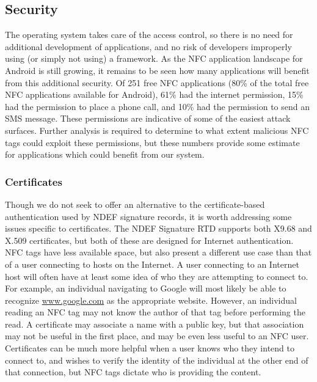 \documentclass[12pt]{article}
\begin{document}
\subsection{Security}
The operating system takes care of the access control, so there is no need for additional development of applications, and no risk of developers improperly using (or simply not using) a framework.
As the NFC application landscape for Android is still growing, it remains to be seen how many applications will benefit from this additional security.
Of 251 free NFC applications (80\% of the total free NFC applications available for Android), 61\% had the internet permission, 15\% had the permission to place a phone call, and 10\% had the permission to send an SMS message.
These permissions are indicative of some of the easiest attack surfaces.
Further analysis is required to determine to what extent malicious NFC tags could exploit these permissions, but these numbers provide some estimate for applications which could benefit from our system.
\subsubsection{Certificates}
Though we do not seek to offer an alternative to the certificate-based authentication used by NDEF signature records, it is worth addressing some issues specific to certificates.
The NDEF Signature RTD supports both X9.68 and X.509 certificates, but both of these are designed for Internet authentication.
NFC tags have less available space, but also present a different use case than that of a user connecting to hosts on the Internet.
A user connecting to an Internet host will often have at least some idea of who they are attempting to connect to.
For example, an individual navigating to Google will most likely be able to recognize \url{www.google.com} as the appropriate website.
However, an individual reading an NFC tag may not know the author of that tag before performing the read.
A certificate may associate a name with a public key, but that association may not be useful in the first place\cite{ellison2000}, and may be even less useful to an NFC user.
Certificates can be much more helpful when a user knows who they intend to connect to, and wishes to verify the identity of the individual at the other end of that connection, but NFC tags dictate who is providing the content.
\end{document}
